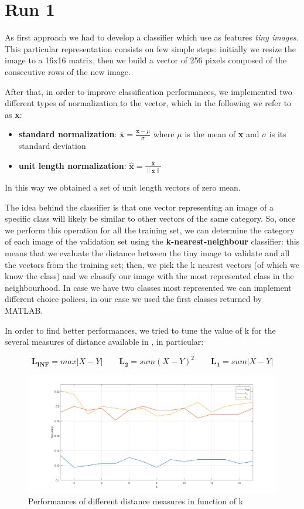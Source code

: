 \section{Run 1}

As first approach we had to develop a classifier which use as features \textit{tiny images}. This particular representation consists on few simple steps: initially we resize the image to a 16x16 matrix, then we build a vector of 256 pixels composed of the consecutive rows of the new image. 

After that, in order to improve classification performances, we implemented two different types of normalization to the vector, which in the following we refer to as \textbf{x}:
\begin{itemize}
	\item \textbf{standard normalization}: $\mathbf{\bar{x}} = \frac{\mathbf{x} - \mu}{\sigma}$ where $\mu$ is the mean of \textbf{x} and $\sigma$ is its standard deviation
	\item \textbf{unit length normalization}: $\mathbf{\widehat{x}} = \frac{\mathbf{\bar{x}}}{\left \| \mathbf{\bar{x}} \right \|}$
\end{itemize} 
In this way we obtained a set of unit length vectors of zero mean.

The idea behind the classifier is that one vector representing an image of a specific class will likely be similar to other vectors of the same category. So, once we perform this operation for all the training set, we can determine the category of each image of the validation set using the \textbf{k-nearest-neighbour} classifier: this means that we evaluate the distance between the tiny image to validate and all the vectors from the training set; then, we pick the k nearest vectors (of which we know the class) and we classify our image with the most represented class in the neighbourhood. In case we have two classes most represented we can implement different choice polices, in our case we used the first classes returned by MATLAB.

In order to find better performances, we tried to tune the value of k for the several measures of distance available in , in particular:

\begin{equation}
	\mathbf{L_{INF}}=  max|X - Y| \qquad
	\mathbf{L_2}= sum(X - Y)^2 \qquad
	\mathbf{L_1}= sum|X - Y|
\end{equation} 
\begin{figure}[h]
	\centering
		\includegraphics[height=.35\linewidth]{img/kaccuracy}
	\caption{Performances of different distance measures in function of k }
	\label{fig_kaccuracy}
\end{figure}

